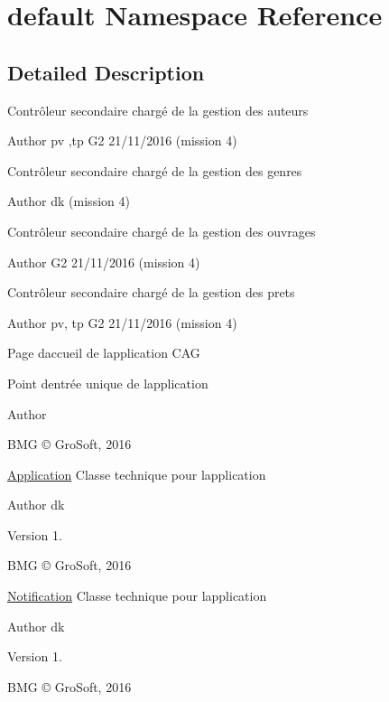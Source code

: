 \hypertarget{namespacedefault}{}\section{default Namespace Reference}
\label{namespacedefault}


\subsection{Detailed Description}
Contrôleur secondaire chargé de la gestion des auteurs \begin{DoxyAuthor}{Author}
pv ,tp G2 21/11/2016 (mission 4)
\end{DoxyAuthor}
Contrôleur secondaire chargé de la gestion des genres \begin{DoxyAuthor}{Author}
dk (mission 4)
\end{DoxyAuthor}
Contrôleur secondaire chargé de la gestion des ouvrages \begin{DoxyAuthor}{Author}
G2 21/11/2016 (mission 4)
\end{DoxyAuthor}
Contrôleur secondaire chargé de la gestion des prets \begin{DoxyAuthor}{Author}
pv, tp G2 21/11/2016 (mission 4)
\end{DoxyAuthor}
Page d\textquotesingle{}accueil de l\textquotesingle{}application C\+AG

Point d\textquotesingle{}entrée unique de l\textquotesingle{}application \begin{DoxyAuthor}{Author}

\end{DoxyAuthor}
B\+MG © Gro\+Soft, 2016

\hyperlink{class_application}{Application} Classe technique pour l\textquotesingle{}application

\begin{DoxyAuthor}{Author}
dk 
\end{DoxyAuthor}
\begin{DoxyVersion}{Version}
1.
\end{DoxyVersion}
B\+MG © Gro\+Soft, 2016

\hyperlink{class_notification}{Notification} Classe technique pour l\textquotesingle{}application

\begin{DoxyAuthor}{Author}
dk 
\end{DoxyAuthor}
\begin{DoxyVersion}{Version}
1.
\end{DoxyVersion}
B\+MG © Gro\+Soft, 2016

